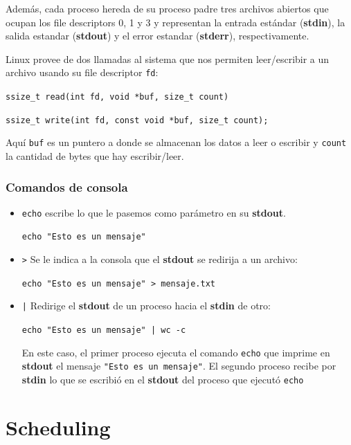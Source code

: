 	Además, cada proceso hereda de su proceso padre tres archivos abiertos que ocupan los file descriptors 0, 1 y 3 y representan la entrada estándar (\textbf{stdin}), la salida estandar (\textbf{stdout}) y el error estandar (\textbf{stderr}), respectivamente.
	
	Linux provee de dos llamadas al sistema que nos permiten leer/escribir a un archivo usando su file descriptor \texttt{fd}:
	
	\begin{center}
		\texttt{ssize\_t read(int fd, void *buf, size\_t count)}

		\texttt{ssize\_t write(int fd, const void *buf, size\_t count);}
	\end{center}
	
Aquí \texttt{buf} es un puntero a donde se almacenan los datos a leer o escribir y \texttt{count} la cantidad de bytes que hay escribir/leer.

\subsubsection{Comandos de consola}
\begin{itemize}
	\item \texttt{echo} escribe lo que le pasemos como parámetro en su \textbf{stdout}.
	\begin{center}
		\texttt{echo "Esto es un mensaje"}
	\end{center}
	\item \texttt{>} Se le indica a la consola que el \textbf{stdout} se redirija a un archivo:
	\begin{center}
		\texttt{echo "Esto es un mensaje" > mensaje.txt}
	\end{center}
	\item \texttt{|} Redirige el \textbf{stdout} de un proceso hacia el \textbf{stdin} de otro:
	
	\begin{center}
		\texttt{echo "Esto es un mensaje" | wc -c}
	\end{center}

	En este caso, el primer proceso ejecuta el comando \texttt{echo} que imprime en \textbf{stdout} el mensaje \texttt{"Esto es un mensaje"}. El segundo proceso recibe por \textbf{stdin} lo que se escribió en el \textbf{stdout} del proceso que ejecutó \texttt{echo}
\end{itemize}

\newpage
	
\section{Scheduling}
